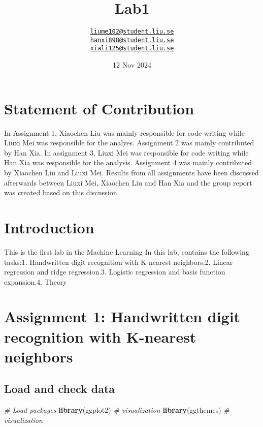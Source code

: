 \documentclass[
]{article}
\title{Lab1}
\author{\href{mailto:liume102@student.liu.se}{\nolinkurl{liume102@student.liu.se}}\\
\href{mailto:hanxi898@student.liu.se}{\nolinkurl{hanxi898@student.liu.se}}\\
\href{mailto:xiali125@student.liu.se}{\nolinkurl{xiali125@student.liu.se}}}
\date{12 Nov 2024}
\newenvironment{Shaded}{\begin{snugshade}}{\end{snugshade}}
\newcommand{\CommentTok}[1]{\textcolor[rgb]{0.56,0.35,0.01}{\textit{#1}}}
\newcommand{\FunctionTok}[1]{\textcolor[rgb]{0.13,0.29,0.53}{\textbf{#1}}}
\newcommand{\NormalTok}[1]{#1}
\newcommand{\StringTok}[1]{\textcolor[rgb]{0.31,0.60,0.02}{#1}}
\begin{document}
\maketitle

\section{Statement of Contribution}\label{statement-of-contribution}

In Assignment 1, Xiaochen Liu was mainly responsible for code writing
while Liuxi Mei was responsible for the analyes. Assignment 2 was mainly
contributed by Han Xia. In assignment 3, Liuxi Mei was responsible for
code writing while Han Xia was responsible for the analysis. Assignment
4 was mainly contributed by Xiaochen Liu and Liuxi Mei. Results from all
assignments have been discussed afterwards between Liuxi Mei, Xiaochen
Liu and Han Xia and the group report was created based on this
discussion.

\section{Introduction}\label{introduction}

This is the first lab in the Machine Learning In this lab, contains the
following tasks:1. Handwritten digit recognition with K-nearest
neighbors.2. Linear regression and ridge regression.3. Logistic
regression and basis function expansion.4. Theory

\section{Assignment 1: Handwritten digit recognition with K-nearest
neighbors}\label{assignment-1-handwritten-digit-recognition-with-k-nearest-neighbors}

\subsection{Load and check data}\label{load-and-check-data}

\begin{Shaded}
\begin{Highlighting}[]
\CommentTok{\# Load packages}
\FunctionTok{library}\NormalTok{(}\StringTok{\textquotesingle{}ggplot2\textquotesingle{}}\NormalTok{) }\CommentTok{\# visualization}
\FunctionTok{library}\NormalTok{(}\StringTok{\textquotesingle{}ggthemes\textquotesingle{}}\NormalTok{) }\CommentTok{\# visualization}
\end{Highlighting}
\end{Shaded}
\end{document}
